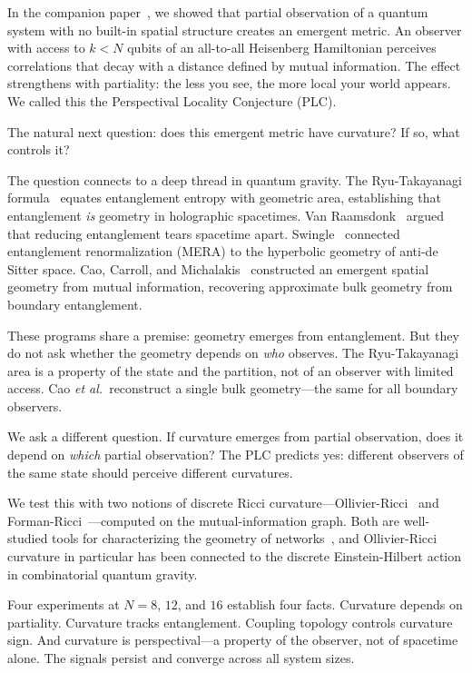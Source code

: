 \documentclass[aps,pra,twocolumn,superscriptaddress]{revtex4-2}
\begin{document}
In the companion paper~\cite{glass2026plc1}, we showed that partial observation of a quantum system with no built-in spatial structure creates an emergent metric. An observer with access to $k < N$ qubits of an all-to-all Heisenberg Hamiltonian perceives correlations that decay with a distance defined by mutual information. The effect strengthens with partiality: the less you see, the more local your world appears. We called this the Perspectival Locality Conjecture (PLC).

The natural next question: does this emergent metric have curvature? If so, what controls it?

The question connects to a deep thread in quantum gravity. The Ryu-Takayanagi formula~\cite{ryu2006} equates entanglement entropy with geometric area, establishing that entanglement \emph{is} geometry in holographic spacetimes. Van Raamsdonk~\cite{vanraamsdonk2010} argued that reducing entanglement tears spacetime apart. Swingle~\cite{swingle2012} connected entanglement renormalization (MERA) to the hyperbolic geometry of anti-de Sitter space. Cao, Carroll, and Michalakis~\cite{cao2017} constructed an emergent spatial geometry from mutual information, recovering approximate bulk geometry from boundary entanglement.

These programs share a premise: geometry emerges from entanglement. But they do not ask whether the geometry depends on \emph{who} observes. The Ryu-Takayanagi area is a property of the state and the partition, not of an observer with limited access. Cao \textit{et al.}\ reconstruct a single bulk geometry---the same for all boundary observers.

We ask a different question. If curvature emerges from partial observation, does it depend on \emph{which} partial observation? The PLC predicts yes: different observers of the same state should perceive different curvatures.

We test this with two notions of discrete Ricci curvature---Ollivier-Ricci~\cite{ollivier2009} and Forman-Ricci~\cite{forman2003}---computed on the mutual-information graph. Both are well-studied tools for characterizing the geometry of networks~\cite{trugenberger2017}, and Ollivier-Ricci curvature in particular has been connected to the discrete Einstein-Hilbert action in combinatorial quantum gravity.

Four experiments at $N = 8$, $12$, and $16$ establish four facts. Curvature depends on partiality. Curvature tracks entanglement. Coupling topology controls curvature sign. And curvature is perspectival---a property of the observer, not of spacetime alone. The signals persist and converge across all system sizes.
\end{document}
